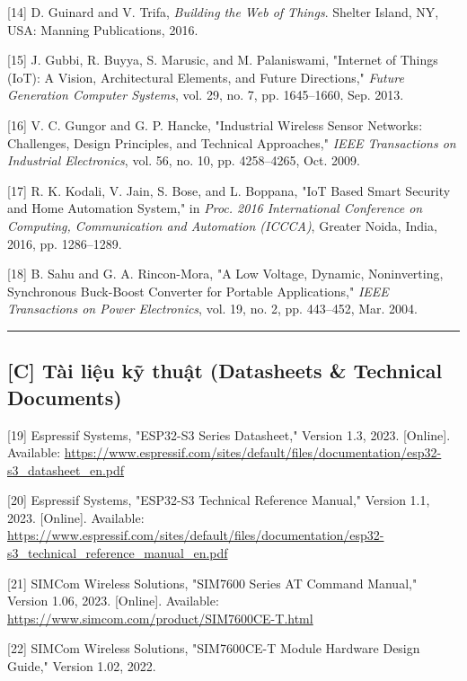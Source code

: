 \documentclass[13pt,a4paper]{extarticle}
\renewcommand{\\}{\thesislongtableorignewline\hline}%
\begin{document}
{[}14{]} D. Guinard and V. Trifa, \emph{Building the Web of Things}.
Shelter Island, NY, USA: Manning Publications, 2016.

{[}15{]} J. Gubbi, R. Buyya, S. Marusic, and M. Palaniswami, "Internet
of Things (IoT): A Vision, Architectural Elements, and Future
Directions," \emph{Future Generation Computer Systems}, vol. 29, no. 7,
pp. 1645--1660, Sep. 2013.

{[}16{]} V. C. Gungor and G. P. Hancke, "Industrial Wireless Sensor
Networks: Challenges, Design Principles, and Technical Approaches,"
\emph{IEEE Transactions on Industrial Electronics}, vol. 56, no. 10, pp.
4258--4265, Oct. 2009.

{[}17{]} R. K. Kodali, V. Jain, S. Bose, and L. Boppana, "IoT Based
Smart Security and Home Automation System," in \emph{Proc. 2016
International Conference on Computing, Communication and Automation
(ICCCA)}, Greater Noida, India, 2016, pp. 1286--1289.

{[}18{]} B. Sahu and G. A. Rincon-Mora, "A Low Voltage, Dynamic,
Noninverting, Synchronous Buck-Boost Converter for Portable
Applications," \emph{IEEE Transactions on Power Electronics}, vol. 19,
no. 2, pp. 443--452, Mar. 2004.

\begin{center}\rule{0.5\linewidth}{0.5pt}\end{center}

\subsection{{[}C{]} Tài liệu kỹ thuật (Datasheets \& Technical
Documents)}\label{c-tuxe0i-liux1ec7u-kux1ef9-thuux1eadt-datasheets--technical-documents}

{[}19{]} Espressif Systems, "ESP32-S3 Series Datasheet," Version 1.3,
2023. {[}Online{]}. Available:
\url{https://www.espressif.com/sites/default/files/documentation/esp32-s3_datasheet_en.pdf}

{[}20{]} Espressif Systems, "ESP32-S3 Technical Reference Manual,"
Version 1.1, 2023. {[}Online{]}. Available:
\url{https://www.espressif.com/sites/default/files/documentation/esp32-s3_technical_reference_manual_en.pdf}

{[}21{]} SIMCom Wireless Solutions, "SIM7600 Series AT Command Manual,"
Version 1.06, 2023. {[}Online{]}. Available:
\url{https://www.simcom.com/product/SIM7600CE-T.html}

{[}22{]} SIMCom Wireless Solutions, "SIM7600CE-T Module Hardware Design
Guide," Version 1.02, 2022.
\end{document}
